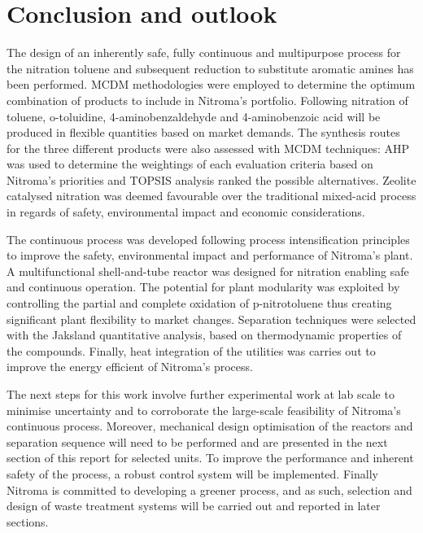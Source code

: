 \section{Conclusion and outlook}

The design of an inherently safe, fully continuous and multipurpose process for the nitration toluene and subsequent reduction to substitute aromatic amines has been performed. MCDM methodologies were employed to determine the optimum combination of products to include in Nitroma's portfolio. Following nitration of toluene, o-toluidine, 4-aminobenzaldehyde and 4-aminobenzoic acid will be produced in flexible quantities based on market demands. The synthesis routes for the three different products were also assessed with MCDM techniques: AHP was used to determine the weightings of each evaluation criteria based on Nitroma's priorities and TOPSIS analysis ranked the possible alternatives. Zeolite catalysed nitration was deemed favourable over the traditional mixed-acid process in regards of safety, environmental impact and economic considerations. 

The continuous process was developed following process intensification principles to improve the safety, environmental impact and performance of Nitroma's plant. A multifunctional shell-and-tube reactor was designed for nitration enabling safe and continuous operation. The potential for plant modularity was exploited by controlling the partial and complete oxidation of p-nitrotoluene thus creating significant plant flexibility to market changes. Separation techniques were selected with the Jaksland quantitative analysis, based on thermodynamic properties of the compounds. Finally, heat integration of the utilities was carries out to improve the energy efficient of Nitroma's process.


The next steps for this work involve further experimental work at lab scale to minimise uncertainty and to corroborate the large-scale feasibility of Nitroma's continuous process. Moreover, mechanical design optimisation of the reactors and separation sequence will need to be performed and are presented in the next section of this report for selected units. To improve the performance and inherent safety of the process, a robust control system will be implemented. Finally Nitroma is committed to developing a greener process, and as such, selection and design of waste treatment systems will be carried out and reported in later sections.